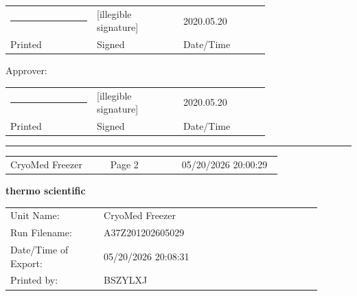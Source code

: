 \documentclass[UTF8,10pt,a4paper,fontset=fandol]{ctexart}
\newcommand{\fieldvalue}[1]{#1}
\newcommand{\handwritten}[1]{#1}
\begin{document}
\begin{tabular}{@{}p{0.25\linewidth}p{0.25\linewidth}p{0.25\linewidth}@{}}
\rule{0.25\linewidth}{0.4pt} &
\fieldvalue{\handwritten{[illegible signature]}} &
\fieldvalue{\handwritten{2020.05.20}} \\
Printed & Signed & Date/Time
\end{tabular}

\vspace{0.15cm}

Approver:

\begin{tabular}{@{}p{0.25\linewidth}p{0.25\linewidth}p{0.25\linewidth}@{}}
\rule{0.25\linewidth}{0.4pt} &
\fieldvalue{\handwritten{[illegible signature]}} &
\fieldvalue{\handwritten{2020.05.20}} \\
Printed & Signed & Date/Time
\end{tabular}

\vfill

\noindent\rule{\linewidth}{0.4pt}

\begin{tabular}{@{}p{0.35\linewidth}p{0.25\linewidth}p{0.35\linewidth}@{}}
CryoMed Freezer & Page 2 & 05/20/2026 20:00:29
\end{tabular}

\newpage

\begin{center}
\textbf{thermo scientific}
\end{center}

\begin{tabular}{@{}p{0.27\linewidth}p{0.63\linewidth}@{}}
Unit Name: &
\fieldvalue{CryoMed Freezer} \\[2pt]
Run Filename: &
\fieldvalue{A37Z201202605029} \\[2pt]
Date/Time of Export: &
\fieldvalue{05/20/2026 20:08:31} \\[2pt]
Printed by: &
\fieldvalue{BSZYLXJ}
\end{tabular}
\end{document}
